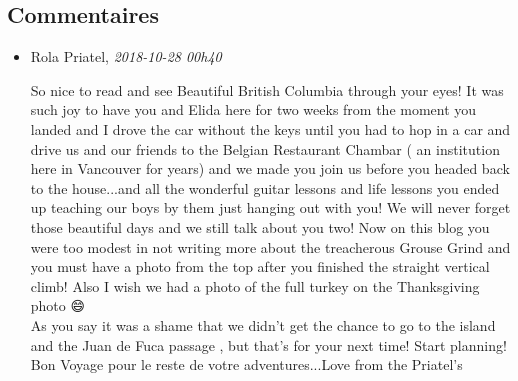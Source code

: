 \documentclass[]{article}
\date{}
\begin{document}
\hypertarget{commentaires}{%
\subsection{Commentaires}\label{commentaires}}

\begin{itemize}
\item
  Rola Priatel, \emph{2018-10-28 00h40}

  So nice to read and see Beautiful British Columbia through your eyes!
  It was such joy to have you and Elida here for two weeks from the
  moment you landed and I drove the car without the keys until you had
  to hop in a car and drive us and our friends to the Belgian Restaurant
  Chambar ( an institution here in Vancouver for years) and we made you
  join us before you headed back to the house...and all the wonderful
  guitar lessons and life lessons you ended up teaching our boys by them
  just hanging out with you! We will never forget those beautiful days
  and we still talk about you two! Now on this blog you were too modest
  in not writing more about the treacherous Grouse Grind and you must
  have a photo from the top after you finished the straight vertical
  climb! Also I wish we had a photo of the full turkey on the
  Thanksgiving photo 😄\\
  As you say it was a shame that we didn't get the chance to go to the
  island and the Juan de Fuca passage , but that's for your next time!
  Start planning! Bon Voyage pour le reste de votre adventures...Love
  from the Priatel's
\end{itemize}
\end{document}
